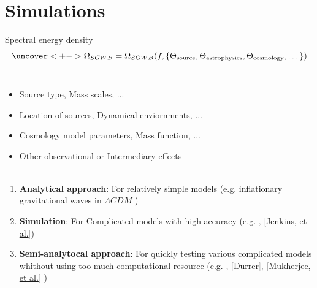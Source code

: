 
\section{Simulations}
\frame{\sectionpage}

\begin{frame}{Spectral energy density}
\begin{equation*}
	\uncover<+->{
		\Omega_{SGWB} = \Omega_{SGWB} (f, \{\Theta_{\text{source}}, \Theta_{\text{astrophysics}}, \Theta_{\text{cosmology}}, \dots\})
	}
\end{equation*}
~\\
\begin{itemize}[<+->]
	\item Source type, Mass scales, ...
	\item Location of sources, Dynamical enviornments, ...
	\item Cosmology model parameters, Mass function, ...
	\item Other observational or Intermediary effects\\~\\
\end{itemize}
\begin{enumerate}[<+->]
	\item \textbf{Analytical approach}: For relatively simple models (e.g. inflationary gravitational waves in $\Lambda CDM$ \textcolor{gray}{\fontsize{7.5}{10}})
	
	\item \textbf{Simulation}: For Complicated models with high accuracy (e.g. \textcolor{gray}{\fontsize{7.5}{10}, [\href{https://journals.aps.org/prd/abstract/10.1103/PhysRevD.98.063501}{Jenkins, et al.}]})
	
	\item \textbf{Semi-analytocal approach}: For quickly testing various complicated models whithout using too much computational resource (e.g. 
	\textcolor{gray}{\fontsize{7.5}{10}, [\href{https://iopscience.iop.org/article/10.1088/1742-6596/222/1/012021/meta}{Durrer}],
	[\href{https://academic.oup.com/mnras/article-abstract/506/3/3977/6317617}{Mukherjee, et al.}]
	})
\end{enumerate}
\end{frame}

